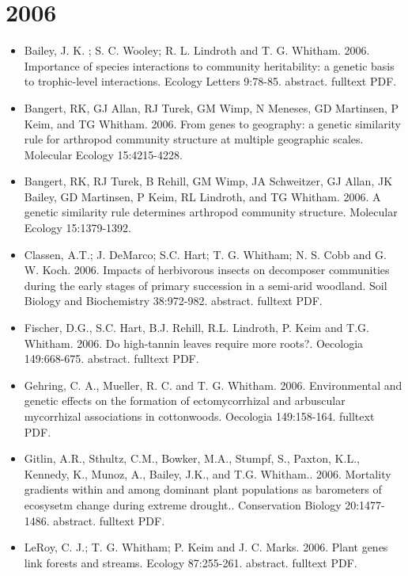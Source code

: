 \documentclass[12pt]{article}
\begin{document}
\section{2006}
\begin{itemize}
\item Bailey, J. K. ; S. C. Wooley; R. L. Lindroth and
T. G. Whitham. 2006. Importance of species interactions to community
heritability: a genetic basis to trophic-level interactions. Ecology
Letters 9:78-85. abstract. fulltext PDF.

\item Bangert, RK, GJ Allan, RJ Turek, GM Wimp, N Meneses, GD Martinsen, P
Keim, and TG Whitham. 2006. From genes to geography: a genetic
similarity rule for arthropod community structure at multiple
geographic scales. Molecular Ecology 15:4215-4228.
 
\item Bangert, RK, RJ Turek, B Rehill, GM Wimp, JA Schweitzer, GJ Allan, JK
Bailey, GD Martinsen, P Keim, RL Lindroth, and TG Whitham. 2006. A
genetic similarity rule determines arthropod community
structure. Molecular Ecology 15:1379-1392.
 
\item Classen, A.T.; J. DeMarco; S.C. Hart; T. G. Whitham; N. S. Cobb and
G. W. Koch. 2006. Impacts of herbivorous insects on decomposer
communities during the early stages of primary succession in a
semi-arid woodland. Soil Biology and Biochemistry
38:972-982. abstract. fulltext PDF.
 
\item Fischer, D.G., S.C. Hart, B.J. Rehill, R.L. Lindroth, P. Keim and
T.G. Whitham. 2006. Do high-tannin leaves require more
roots?. Oecologia 149:668-675. abstract. fulltext PDF.
 
\item Gehring, C. A., Mueller, R. C. and T. G. Whitham. 2006. Environmental
and genetic effects on the formation of ectomycorrhizal and arbuscular
mycorrhizal associations in cottonwoods. Oecologia
149:158-164. fulltext PDF.
 
\item Gitlin, A.R., Sthultz, C.M., Bowker, M.A., Stumpf, S., Paxton, K.L.,
Kennedy, K., Munoz, A., Bailey, J.K., and
T.G. Whitham.. 2006. Mortality gradients within and among dominant
plant populations as barometers of ecosysetm change during extreme
drought.. Conservation Biology 20:1477-1486. abstract. fulltext PDF.
 
\item LeRoy, C. J.; T. G. Whitham; P. Keim and J. C. Marks. 2006. Plant
genes link forests and streams. Ecology 87:255-261. abstract. fulltext
PDF.
 

\end{itemize}
\end{document}
